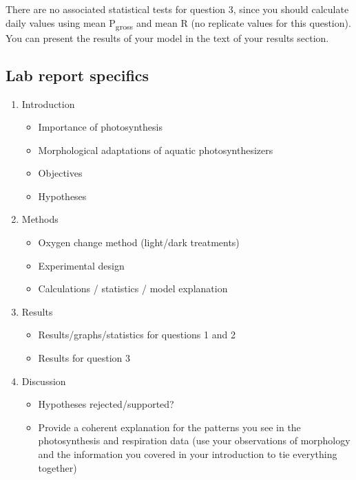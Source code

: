 \documentclass[11pt,]{article}
\providecommand{\tightlist}{%
\setlength{\itemsep}{0pt}\setlength{\parskip}{0pt}}
\begin{document}
There are no associated statistical tests for question 3, since you
should calculate daily values using mean P\textsubscript{gross} and mean
R (no replicate values for this question). You can present the results
of your model in the text of your results section.

\pagebreak

\subsection{Lab report specifics}\label{lab-report-specifics}

\begin{enumerate}
\def\labelenumi{\arabic{enumi}.}
\tightlist
\item
  Introduction

  \begin{itemize}
  \tightlist
  \item
    Importance of photosynthesis
  \item
    Morphological adaptations of aquatic photosynthesizers
  \item
    Objectives
  \item
    Hypotheses
  \end{itemize}
\item
  Methods

  \begin{itemize}
  \tightlist
  \item
    Oxygen change method (light/dark treatments)
  \item
    Experimental design
  \item
    Calculations / statistics / model explanation
  \end{itemize}
\item
  Results

  \begin{itemize}
  \tightlist
  \item
    Results/graphs/statistics for questions 1 and 2
  \item
    Results for question 3
  \end{itemize}
\item
  Discussion

  \begin{itemize}
  \tightlist
  \item
    Hypotheses rejected/supported?
  \item
    Provide a coherent explanation for the patterns you see in the
    photosynthesis and respiration data (use your observations of
    morphology and the information you covered in your introduction to
    tie everything together)
  \end{itemize}
\end{enumerate}
\end{document}

